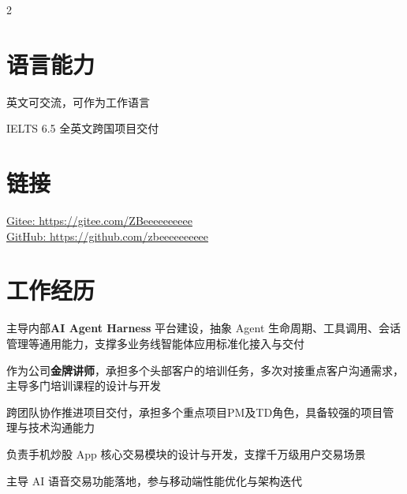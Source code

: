 \documentclass[]{deedy-resume-openfont}
\begin{document}
\begin{paracol}{2}
\sectionsep


\section{语言能力}

英文可交流，可作为工作语言

IELTS 6.5 \textbullet{} 全英文跨国项目交付

\sectionsep


\section{链接}

\href{https://gitee.com/ZBeeeeeeeeee}{Gitee: https://gitee.com/ZBeeeeeeeeee} \\
\href{https://github.com/zbeeeeeeeeee}{GitHub: https://github.com/zbeeeeeeeeee}

%
%
%

\switchcolumn
\raggedright
\color{primary}


\section{工作经历}

\begin{tightemize}
    \item 主导内部\textbf{AI Agent Harness} 平台建设，抽象 Agent 生命周期、工具调用、会话管理等通用能力，支撑多业务线智能体应用标准化接入与交付
    \item 作为公司\textbf{金牌讲师}，承担多个头部客户的培训任务，多次对接重点客户沟通需求，主导多门培训课程的设计与开发
    \item 跨团队协作推进项目交付，承担多个重点项目PM及TD角色，具备较强的项目管理与技术沟通能力
\end{tightemize}
\sectionsep

\begin{tightemize}
    \item 负责手机炒股 App 核心交易模块的设计与开发，支撑千万级用户交易场景
    \item 主导 AI 语音交易功能落地，参与移动端性能优化与架构迭代
\end{tightemize}
\sectionsep


\end{paracol}
\end{document}
